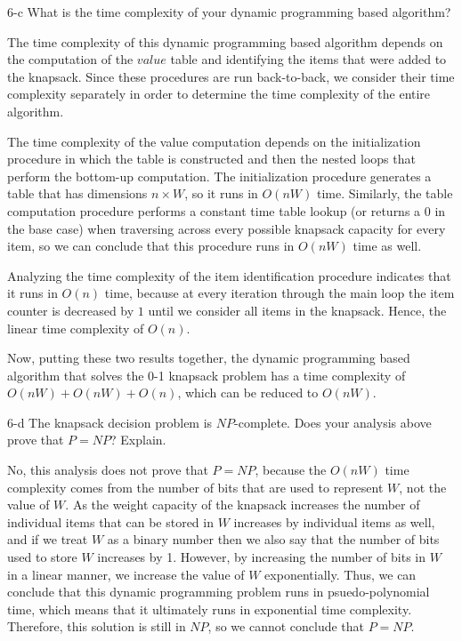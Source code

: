 \documentclass[11pt]{article}
\begin{document}
\begin{prob}{6-c}
What is the time complexity of your dynamic programming based algorithm?
\end{prob}
\begin{sol}
The time complexity of this dynamic programming based algorithm depends on the computation of the $value$ table and identifying the items that were added to the knapsack. Since these procedures are run back-to-back, we consider their time complexity separately in order to determine the time complexity of the entire algorithm.

The time complexity of the value computation depends on the initialization procedure in which the table is constructed and then the nested loops that perform the bottom-up computation. The initialization procedure generates a table that has dimensions $n \times W$, so it runs in $O(nW)$ time. Similarly, the table computation procedure performs a constant time table lookup (or returns a $0$ in the base case) when traversing across every possible knapsack capacity for every item, so we can conclude that this procedure runs in $O(nW)$ time as well.

Analyzing the time complexity of the item identification procedure indicates that it runs in $O(n)$ time, because at every iteration through the main loop the item counter is decreased by $1$ until we consider all items in the knapsack. Hence, the linear time complexity of $O(n)$.

Now, putting these two results together, the dynamic programming based algorithm that solves the 0-1 knapsack problem has a time complexity of $O(nW) + O(nW) + O(n)$, which can be reduced to $O(nW)$. 
\end{sol}

\begin{prob}{6-d}
The knapsack decision problem is $NP$-complete. Does your analysis above prove that $P = NP$? Explain.
\end{prob}
\begin{sol}
No, this analysis does not prove that $P = NP$, because the $O(nW)$ time complexity comes from the number of bits that are used to represent $W$, not the value of $W$. As the weight capacity of the knapsack increases the number of individual items that can be stored in $W$ increases by individual items as well, and if we treat $W$ as a binary number then we also say that the number of bits used to store $W$ increases by 1. However, by increasing the number of bits in $W$ in a linear manner, we increase the value of $W$ exponentially. Thus, we can conclude that this dynamic programming problem runs in psuedo-polynomial time, which means that it ultimately runs in exponential time complexity. Therefore, this solution is still in $NP$, so we cannot conclude that $P = NP$.
\end{sol}
\end{document}
